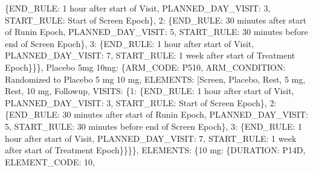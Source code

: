 \documentclass[letterpaper,10pt,english]{sphinxmanual}
\begin{document}
\begin{fulllineitems}
\begin{fulllineitems}
\{\textquotesingle{}END\_RULE\textquotesingle{}: \textquotesingle{}1 hour after start of Visit\textquotesingle{}, \textquotesingle{}PLANNED\_DAY\_VISIT\textquotesingle{}: \textquotesingle{}3\textquotesingle{}, \textquotesingle{}START\_RULE\textquotesingle{}: \textquotesingle{}Start of Screen Epoch\textquotesingle{}\}, \textquotesingle{}2\textquotesingle{}: \{\textquotesingle{}END\_RULE\textquotesingle{}: \textquotesingle{}30 minutes after start of Run\sphinxhyphen{}in Epoch\textquotesingle{}, \textquotesingle{}PLANNED\_DAY\_VISIT\textquotesingle{}: \textquotesingle{}5\textquotesingle{}, \textquotesingle{}START\_RULE\textquotesingle{}: \textquotesingle{}30 minutes before end of Screen Epoch\textquotesingle{}\}, \textquotesingle{}3\textquotesingle{}: \{\textquotesingle{}END\_RULE\textquotesingle{}: \textquotesingle{}1 hour after start of Visit\textquotesingle{}, \textquotesingle{}PLANNED\_DAY\_VISIT\textquotesingle{}: \textquotesingle{}7\textquotesingle{}, \textquotesingle{}START\_RULE\textquotesingle{}: \textquotesingle{}1 week after start of Treatment Epoch\textquotesingle{}\}\}\}, \textquotesingle{}Placebo \sphinxhyphen{} 5mg \sphinxhyphen{} 10mg\textquotesingle{}: \{\textquotesingle{}ARM\_CODE\textquotesingle{}: \textquotesingle{}P\sphinxhyphen{}5\sphinxhyphen{}10\textquotesingle{}, \textquotesingle{}ARM\_CONDITION\textquotesingle{}: \textquotesingle{}Randomized to Placebo \sphinxhyphen{} 5 mg \sphinxhyphen{} 10 mg\textquotesingle{}, \textquotesingle{}ELEMENTS\textquotesingle{}: {[}\textquotesingle{}Screen\textquotesingle{}, \textquotesingle{}Placebo\textquotesingle{}, \textquotesingle{}Rest\textquotesingle{}, \textquotesingle{}5 mg\textquotesingle{}, \textquotesingle{}Rest\textquotesingle{}, \textquotesingle{}10 mg\textquotesingle{}, \textquotesingle{}Follow\sphinxhyphen{}up\textquotesingle{}{]}, \textquotesingle{}VISITS\textquotesingle{}: \{\textquotesingle{}1\textquotesingle{}: \{\textquotesingle{}END\_RULE\textquotesingle{}: \textquotesingle{}1 hour after start of Visit\textquotesingle{}, \textquotesingle{}PLANNED\_DAY\_VISIT\textquotesingle{}: \textquotesingle{}3\textquotesingle{}, \textquotesingle{}START\_RULE\textquotesingle{}: \textquotesingle{}Start of Screen Epoch\textquotesingle{}\}, \textquotesingle{}2\textquotesingle{}: \{\textquotesingle{}END\_RULE\textquotesingle{}: \textquotesingle{}30 minutes after start of Run\sphinxhyphen{}in Epoch\textquotesingle{}, \textquotesingle{}PLANNED\_DAY\_VISIT\textquotesingle{}: \textquotesingle{}5\textquotesingle{}, \textquotesingle{}START\_RULE\textquotesingle{}: \textquotesingle{}30 minutes before end of Screen Epoch\textquotesingle{}\}, \textquotesingle{}3\textquotesingle{}: \{\textquotesingle{}END\_RULE\textquotesingle{}: \textquotesingle{}1 hour after start of Visit\textquotesingle{}, \textquotesingle{}PLANNED\_DAY\_VISIT\textquotesingle{}: \textquotesingle{}7\textquotesingle{}, \textquotesingle{}START\_RULE\textquotesingle{}: \textquotesingle{}1 week after start of Treatment Epoch\textquotesingle{}\}\}\}\}, \textquotesingle{}ELEMENTS\textquotesingle{}: \{\textquotesingle{}10 mg\textquotesingle{}: \{\textquotesingle{}DURATION\textquotesingle{}: \textquotesingle{}P14D\textquotesingle{}, \textquotesingle{}ELEMENT\_CODE\textquotesingle{}: \textquotesingle{}10\textquotesingle{}, 
\end{fulllineitems}
\end{fulllineitems}
\end{document}
